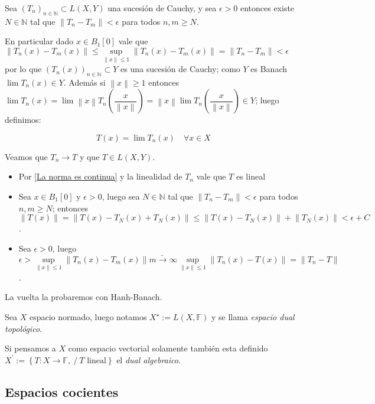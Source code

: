 \documentclass[11pt]{article}
\newcommand{\N}{{\mathbb{N}}}
\newcommand{\norm}[1]{\left\lVert#1\right\rVert}
\newcommand{\sett}[1]{\left\lbrace#1\right\rbrace}
\numberwithin{theorem}{subsection}
\newenvironment{proof}[1][Demostraci\'on]{\begin{trivlist}
		\item[\hskip \labelsep {\bfseries #1}]}{\end{trivlist}}
\newenvironment{definition}[1][Definici\'on]{\begin{trivlist}
		\item[\hskip \labelsep {\bfseries #1}]}{\end{trivlist}}
\newcommand{\qed}{\nobreak \ifvmode \relax \else
	\ifdim\lastskip<1.5em \hskip-\lastskip
	\hskip1.5em plus0em minus0.5em \fi \nobreak
	\vrule height0.75em width0.5em depth0.25em\fi}
\begin{document}
\begin{proof}
	Sea $(T_n)_{n \in \N} \subset L(X,Y)$ una sucesi\'on de Cauchy, y sea $\epsilon > 0$ entonces existe $N \in \N$ tal que $\norm{T_n - T_m} < \epsilon$ para todos $n,m \geq N$.
	
	En particular dado $x \in B_{1}[0]$ vale que ${\norm{T_n(x) - T_m(x)}} \leq  \sup\limits_{\norm{x} \leq 1} {\norm{T_n(x) - T_m(x)}} = \norm{T_n - T_m} < \epsilon$ por lo que $\left(T_n(x)\right)_{n \in \N} \subset Y$ es una sucesi\'on de Cauchy; como $Y$ es Banach $\lim T_n(x) \in Y$. Adem\'as si $\norm{x} \geq 1$ entonces $\lim T_n(x) = \lim \norm{x}T_n\left(\dfrac{x}{\norm{x}}\right) = \norm{x} \lim T_n \left(\dfrac{x}{\norm{x}}\right) \in Y$; luego definimos:
	
	\[
	T(x) = \lim T_n(x) \quad \forall x \in X
	\]
	
	Veamos que $T_n \rightarrow T$ y que $T \in L(X,Y)$.
	
	\begin{itemize}
		
		\item Por \ref{La norma es continua} y la linealidad de $T_n$ vale que $T$ es lineal
		\item Sea $x \in B_1[0]$ y $\epsilon > 0$, luego sea $N \in \N$ tal que $\norm{T_n - T_m} < \epsilon$ para todos $n,m \geq N$; entonces $\norm{T(x)} = \norm{T(x) - T_N(x) + T_N(x)} \leq \norm{T(x) - T_N(x)} + \norm{T_N(x)} < \epsilon + C$.
		
		\item Sea $\epsilon > 0$, luego $\epsilon > \sup\limits_{\norm{x} \leq 1} {\norm{T_n(x) - T_m(x)}} \underrightarrow{m \rightarrow \infty} \sup\limits_{\norm{x} \leq 1} {\norm{T_n(x) - T(x)}} = \norm{T_n - T}$. 
	\end{itemize}
	
	La vuelta la probaremos con Hanh-Banach. \qed
	
\end{proof}

\begin{definition}
	Sea $X$ espacio normado, luego notamos $X^{\star} := L(X, \mathbb{F})$ y se llama \textit{espacio dual topol\'ogico}.
	
	Si pensamos a $X$ como espacio vectorial solamente tambi\'en esta definido $X^{'} := \sett{T:X \rightarrow \mathbb{F}, \ / \ T \text{ lineal}}$ el \textit{ dual algebraico}.

\end{definition}

\subsection{Espacios cocientes}
\end{document}
